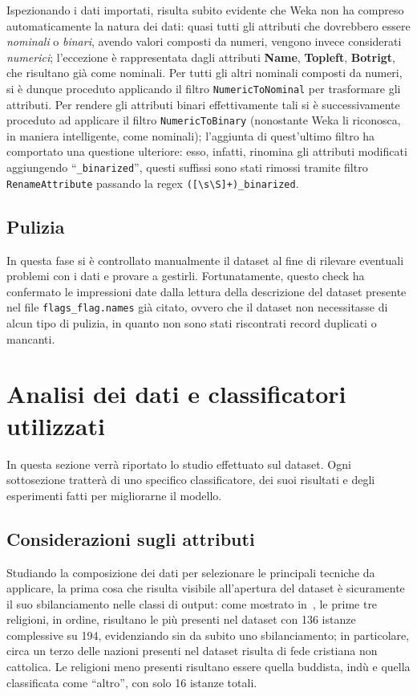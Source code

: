 \documentclass[a4paper,11pt,twoside,notitlepage,final]{scrartcl}
\begin{document}
Ispezionando i dati importati, risulta subito evidente che Weka non ha compreso automaticamente la natura dei dati:
quasi tutti gli attributi che dovrebbero essere \emph{nominali} o \emph{binari}, avendo valori composti da numeri, vengono invece considerati \emph{numerici}; l'eccezione
è rappresentata dagli attributi \textbf{Name}, \textbf{Topleft}, \textbf{Botrigt}, che risultano già come nominali.
Per tutti gli altri nominali composti da numeri, si è dunque proceduto applicando il filtro \texttt{NumericToNominal}
per trasformare gli attributi. Per rendere gli attributi binari
effettivamente tali si è successivamente proceduto ad applicare il filtro \texttt{NumericToBinary}
(nonostante Weka li riconosca, in maniera intelligente, come nominali); l'aggiunta di quest'ultimo
filtro ha comportato una questione ulteriore: esso, infatti, rinomina gli attributi modificati aggiungendo
``\texttt{\_binarized}'', questi suffissi sono stati rimossi tramite filtro \texttt{RenameAttribute}
passando la regex \verb|([\s\S]+)_binarized|.

\subsection{Pulizia}

In questa fase si è controllato manualmente il dataset al fine di rilevare eventuali problemi con i dati e provare a gestirli.
Fortunatamente, questo check ha confermato le impressioni date dalla lettura della descrizione del dataset presente
nel file \texttt{flags\_flag.names} già citato, ovvero che il dataset non necessitasse di alcun tipo di pulizia, in quanto
non sono stati riscontrati record duplicati o mancanti.

\section{Analisi dei dati e classificatori utilizzati}

In questa sezione verrà riportato lo studio effettuato sul dataset.
Ogni sottosezione tratterà di uno specifico classificatore, dei suoi risultati e degli esperimenti fatti per migliorarne il modello.

\subsection{Considerazioni sugli attributi}

Studiando la composizione dei dati per selezionare le principali tecniche da applicare,
la prima cosa che risulta visibile all'apertura del dataset è sicuramente il suo sbilanciamento nelle classi di output:
come mostrato in~, le prime tre religioni, in ordine, risultano le più
presenti nel dataset con 136 istanze complessive su 194, evidenziando sin da subito uno sbilanciamento;
in particolare, circa un terzo delle nazioni presenti nel dataset risulta di fede cristiana non cattolica.
Le religioni meno presenti risultano essere quella buddista, indù e quella classificata come ``altro'', con solo
16 istanze totali.
\end{document}
